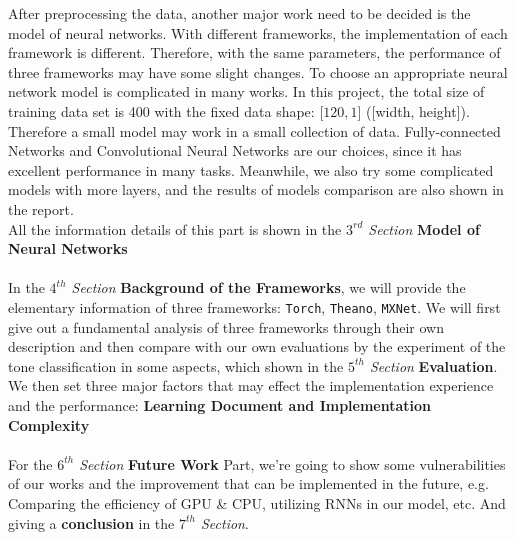 \documentclass[12pt]{article}
\begin{document}
After preprocessing the data, another major work need to be decided is the model of neural networks. With different frameworks, the implementation of each framework is different. Therefore, with the same parameters, the performance of three frameworks may have some slight changes. To choose an appropriate neural network model is complicated in many works. In this project, the total size of training data set is 400 with the fixed data shape: [$120, 1$] ([width, height]). Therefore a small model may work in a small collection of data. Fully-connected Networks and Convolutional Neural Networks are our choices, since it has excellent performance in many tasks. Meanwhile, we also try some complicated models with more layers, and the results of models comparison are also shown in the report.\\
All the information details of this part is shown in the {\it $3^{rd}$ Section} {\bf Model of Neural Networks}\\
\\
In the {\it $4^{th}$ Section} {\bf Background of the Frameworks}, we will provide the elementary information of three frameworks: \texttt{Torch}, \texttt{Theano}, \texttt{MXNet}. We will first give out a fundamental analysis of three frameworks through their own description and then compare with our own evaluations by the experiment of the tone classification in some aspects, which shown in the {\it $5^{th}$ Section} {\bf Evaluation}. We then set three major factors that may effect the implementation experience and the performance: {\bf Learning Document and Implementation Complexity}\\
\\
For the {\it $6^{th}$ Section} {\bf Future Work} Part, we're going to show some vulnerabilities of our works and the improvement that can be implemented in the future, e.g. Comparing the efficiency of GPU \& CPU, utilizing RNNs in our model, etc. And giving a {\bf conclusion} in the {\it $7^{th}$ Section}.
\\
\end{document}
